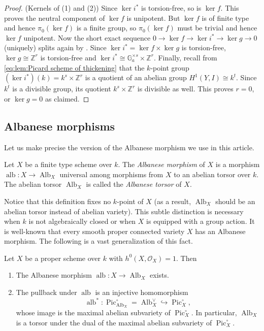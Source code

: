 \documentclass[reqno, letterpaper]{amsart}
\numberwithin{equation}{subsection}
\let\to\longrightarrow
\newcommand{\GG}{\mathbb{G}}
\newcommand{\ZZ}{\mathbb{Z}}
\DeclareMathOperator{\Pic}{Pic}
\DeclareMathOperator{\Alb}{Alb}
\DeclareMathOperator{\alb}{alb}
\begin{document}
\begin{proof}
				\medskip
				
				(Kernels of (1) and (2)) Since $\ker i^*$ is torsion-free, so is $\ker f$. This proves the neutral component of $\ker f$ is unipotent. But $\ker f$ is of finite type and hence $\pi_0 (\ker f)$ is a finite group, so $\pi_0(\ker f)$ must be trivial and hence $\ker f$ unipotent. Now the short exact sequence $0 \to \ker f \to \ker i^* \to \ker g \to 0$ (uniquely) splits again by . Since $\ker i^* = \ker f \times \ker g$ is torsion-free, $\ker g \cong \ZZ^r$ is torsion-free and $\ker i^* \cong \GG_a^{\times s} \times \ZZ^r$. Finally, recall from \eqref{eq:lem:Picard scheme of thickening} that the $k$-point group $(\ker i^*)(k) = k^s \times \ZZ^r$ is a quotient of an abelian group $H^1(Y, I) \cong k^t$. Since $k^t$ is a divisible group, its quotient $k^s \times \ZZ^r$ is divisible as well. This proves $r = 0$, or $\ker g = 0$ as claimed.
			\end{proof}
			
			
			
	\subsection{Albanese morphisms}
		Let us make precise the version of the Albanese morphism we use in this article.
		
		\begin{definition} \label{def:Albanese}
			Let $X$ be a finite type scheme over $k$. The \emph{Albanese morphism} of $X$ is a morphism $\alb : X \to \Alb_X$ universal among morphisms from $X$ to an abelian torsor over $k$. The abelian torsor $\Alb_X$ is called the \emph{Albanese torsor} of $X$.
		\end{definition}
		
		Notice that this definition fixes no $k$-point of $X$ (as a result, $\Alb_X$ should be an abelian torsor instead of abelian variety). This subtle distinction is necessary when $k$ is not algebraically closed or when $X$ is equipped with a group action. It is well-known that every smooth proper connected variety $X$ has an Albanese morphism. The following is a vast generalization of this fact.
		
		\begin{theorem} \label{thm:Albanese}
			Let $X$ be a proper scheme over $k$ with $h^0 (X, \mathcal O_X) = 1$. Then
			\begin{enumerate}
				\item The Albanese morphism $\alb : X \to \Alb_X$ exists.
				\item The pullback under $\alb$ is an injective homomorphism
				\[ \alb^* : \Pic^{\circ}_{\Alb_X} = \Alb_X^\vee \hookrightarrow \Pic^{\circ}_X ,\]
				whose image is the maximal abelian subvariety of $\Pic^{\circ}_X$. In particular, $\Alb_X$ is a torsor under the dual of the maximal abelian subvariety of $\Pic^{\circ}_X$.
			\end{enumerate}
		\end{theorem}
		
\end{document}
